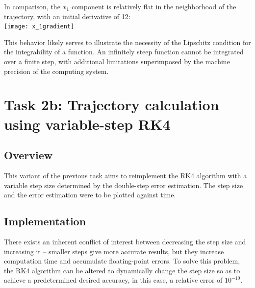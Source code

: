 \documentclass{article}
\begin{document}
	In comparison, the $x_1$ component is relatively flat in the
	neighborhood of the trajectory, with an initial derivative of 12:\\
	\texttt{[image: x\_1gradient]}
	
	This behavior likely serves to illustrate the necessity of the Lipschitz
	condition for the integrability of a function. An infinitely steep
	function cannot be integrated over a finite step, with additional
	limitations superimposed by the machine precision of the computing
	system.
	
	\newpage
	\section{Task 2b: Trajectory calculation using variable-step RK4}
	
	\subsection{Overview}
	
	This variant of the previous task aims to reimplement the RK4 algorithm
	with a variable step size determined by the double-step error
	estimation. The step size and the error estimation were to be plotted
	against time.
	
	\subsection{Implementation}
	
	There exists an inherent conflict of interest between decreasing the
	step size and increasing it -- smaller steps give more accurate results,
	but they increase computation time and accumulate floating-point errors.
	To solve this problem, the RK4 algorithm can be altered to dynamically
	change the step size so as to achieve a predetermined desired accuracy,
	in this case, a relative error of $10^{-10}$.
	
\end{document}
